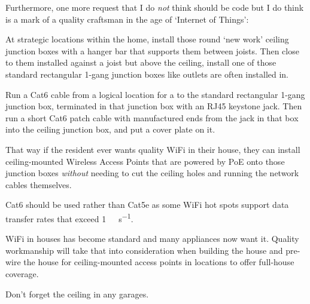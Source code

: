Furthermore, one more request that I do \emph{not} think should be code but I do think is a mark of a quality
craftsman in the age of `Internet of Things':

At strategic locations within the home, install those round `new work' ceiling junction boxes with a hanger bar
that supports them between joists. Then close to them installed against a joist but above the ceiling, install
one of those standard rectangular 1-gang junction boxes like outlets are often installed in.

Run a Cat6 cable from a logical location for a  to the standard rectangular
1-gang junction box, terminated in that junction box with an RJ45 keystone jack. Then run a short Cat6 patch cable
with manufactured ends from the jack in that box into the ceiling junction box, and put a cover plate on it.

That way if the resident ever wants quality WiFi in their house, they can install ceiling-mounted Wireless Access
Points that are powered by PoE onto those junction boxes \emph{without} needing to cut the ceiling holes and running
the network cables themselves.

Cat6 should be used rather than Cat5e as some WiFi hot spots support data transfer rates that exceed
\SI{1}{\giga\bit\per\second}.

WiFi in houses has become standard and many appliances now want it. Quality workmanship will take that into
consideration when building the house and pre-wire the house for ceiling-mounted access points in locations
to offer full-house coverage.

Don't forget the ceiling in any garages.





































